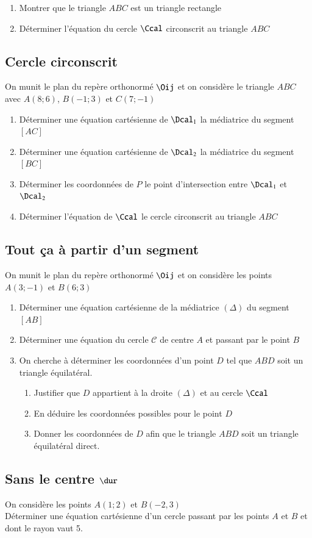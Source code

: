 \documentclass[oneside,12pt]{article}          %
\begin{document}
\begin{enumerate}
    \item Montrer que le triangle $ABC$ est un triangle rectangle
    \item Déterminer l'équation du cercle $\Ccal$ circonscrit au triangle $ABC$
\end{enumerate}



\subsection{Cercle circonscrit}
On munit le plan du repère orthonormé $\Oij$ et on considère le triangle $ABC$ avec $A(8;6)$, $B(-1;3)$ et $C(7;-1)$
\begin{enumerate}
	\item Déterminer une équation cartésienne de $\Dcal_1$ la médiatrice du segment $[AC]$
	\item Déterminer une équation cartésienne de $\Dcal_2$ la médiatrice du segment $[BC]$
	\item Déterminer les coordonnées de $P$ le point d'intersection entre $\Dcal_1$ et $\Dcal_2$
	\item Déterminer l'équation de $\Ccal$ le cercle circonscrit au triangle $ABC$
\end{enumerate}



\subsection{Tout ça à partir d'un segment}
On munit le plan du repère orthonormé $\Oij$ et on considère les points $A(3;-1)$ et $B(6;3)$
\begin{enumerate}
    \item Déterminer une équation cartésienne de la médiatrice $(\Delta)$ du segment $[AB]$
    \item Déterminer une équation du cercle $\mathscr{C}$ de centre $A$ et passant par le point $B$
    \item On cherche à déterminer les coordonnées d'un point $D$ tel que $ABD$ soit un triangle équilatéral.
    \begin{enumerate}
    	\item Justifier que $D$ appartient à la droite $(\Delta)$ et au cercle $\Ccal$
    	\item En déduire les coordonnées possibles pour le point $D$
    	\item Donner les coordonnées de $D$ afin que le triangle $ABD$ soit un triangle équilatéral direct.
    \end{enumerate}
\end{enumerate}



\subsection{Sans le centre $\dur$}

On considère les points $A(1;2)$ et $B(-2,3)$ \\
Déterminer une équation cartésienne d'un cercle passant par les points $A$ et $B$ et dont le rayon vaut 5.
\end{document}
